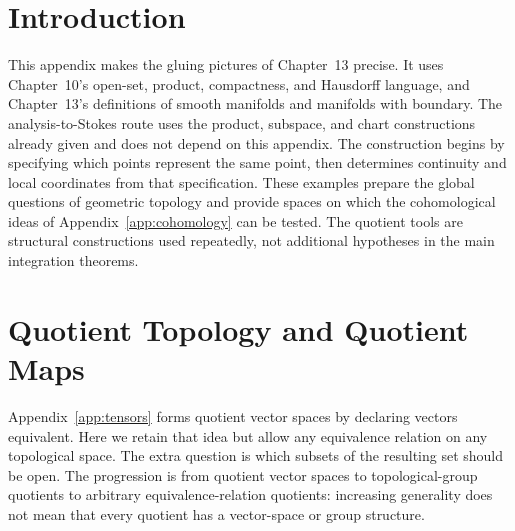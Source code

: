 \label{app:quotients}
\section*{Introduction}
This appendix makes the gluing pictures of Chapter~13 precise. It uses
Chapter~10's open-set, product, compactness, and Hausdorff language, and
Chapter~13's definitions of smooth manifolds and manifolds with boundary.
The analysis-to-Stokes route uses the product, subspace, and chart
constructions already given and does not depend on this appendix.
The construction begins by specifying which points represent the same point,
then determines continuity and local coordinates from that specification.
These examples prepare the global questions of geometric topology and
provide spaces on which the cohomological ideas of Appendix~\ref{app:cohomology}
can be tested. The quotient tools are structural constructions used repeatedly,
not additional hypotheses in the main integration theorems.

\section{Quotient Topology and Quotient Maps}\label{sec:quotient-topology}
Appendix~\ref{app:tensors} forms quotient vector spaces by declaring vectors equivalent.
Here we retain that idea but allow any equivalence relation on any topological
space. The extra question is which subsets of the resulting set should be open.
The progression is from quotient vector spaces to topological-group quotients
to arbitrary equivalence-relation quotients: increasing generality does not
mean that every quotient has a vector-space or group structure.

